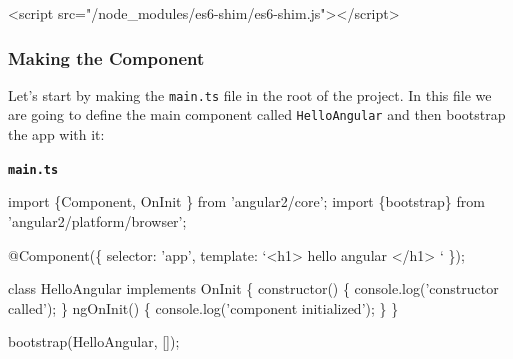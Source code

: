 \documentclass[12pt,]{article}
\newenvironment{Shaded}{}{}
\newcommand{\KeywordTok}[1]{\textcolor[rgb]{0.00,0.00,1.00}{{#1}}}
\newcommand{\StringTok}[1]{\textcolor[rgb]{0.00,0.50,0.50}{{#1}}}
\newcommand{\OtherTok}[1]{\textcolor[rgb]{1.00,0.25,0.00}{{#1}}}
\newcommand{\FunctionTok}[1]{{#1}}
\newcommand{\NormalTok}[1]{{#1}}
\begin{document}
\begin{Shaded}
\begin{Highlighting}[numbers=left,,]
\KeywordTok{<script}\OtherTok{ src=}\StringTok{"/node_modules/es6-shim/es6-shim.js"}\KeywordTok{></script>}
\end{Highlighting}
\end{Shaded}

\subsubsection{Making the Component}\label{making-the-component}

Let's start by making the \texttt{main.ts} file in the root of the
project. In this file we are going to define the main component called
\texttt{HelloAngular} and then bootstrap the app with it:

\textbf{\texttt{main.ts}}

\begin{Shaded}
\begin{Highlighting}[numbers=left,,]
\KeywordTok{import \{Component, OnInit \} from 'angular2/core';}
\KeywordTok{import \{bootstrap\} from 'angular2/platform/browser';}

\FunctionTok{@Component}\NormalTok{(\{}
  \NormalTok{selector: 'app',}
  \NormalTok{template: `<h1> hello angular </h1> `}
\NormalTok{\});}

\KeywordTok{class} \NormalTok{HelloAngular }\KeywordTok{implements} \NormalTok{OnInit  \{}
  \FunctionTok{constructor}\NormalTok{() \{ console.}\FunctionTok{log}\NormalTok{('constructor called'); \}}
  \FunctionTok{ngOnInit}\NormalTok{() \{ console.}\FunctionTok{log}\NormalTok{('component initialized'); \}}
\NormalTok{\}}

\FunctionTok{bootstrap}\NormalTok{(HelloAngular, []);}
\end{Highlighting}
\end{Shaded}
\end{document}
